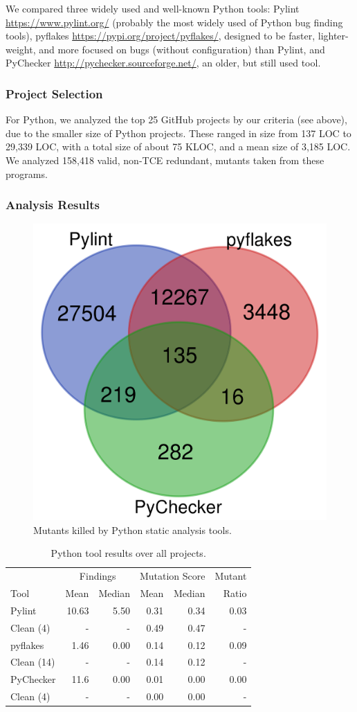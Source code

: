 We compared three widely used and well-known Python tools:  Pylint \url{https://www.pylint.org/} (probably the most widely used of Python bug finding tools), pyflakes \url{https://pypi.org/project/pyflakes/}, designed to be faster, lighter-weight, and more focused on bugs (without configuration) than Pylint, and PyChecker \url{http://pychecker.sourceforge.net/}, an older, but still used tool.

\subsubsection{Project Selection}

For Python, we analyzed the top 25 GitHub projects by our criteria (see above), due to the smaller size of Python projects.  These ranged in size from 137 LOC to 29,339 LOC, with a total size of about 75 KLOC, and a mean size of 3,185 LOC.  We analyzed 158,418 valid, non-TCE redundant, mutants taken from these programs.

\subsubsection{Analysis Results}


\begin{figure}
  \centering
  \includegraphics[width=0.30\columnwidth]{python_new.png}
  \caption{Mutants killed by Python static analysis tools.}
  \label{fig:pythonvenn}
\end{figure}

\begin{table}
\begin{tabular}{l|r|r|r|r|r}
& \multicolumn{2}{|c|}{Findings} & \multicolumn{2}{|c|}{Mutation Score} & Mutant \\
Tool & Mean & Median & Mean & Median & Ratio\\
\hline
\hline
Pylint & 10.63 & 5.50 & 0.31 & 0.34 & 0.03 \\
Clean (4) & - & - & 0.49 & 0.47 & - \\
\hline
pyflakes & 1.46 & 0.00 & 0.14 & 0.12 & 0.09 \\
Clean (14) & - & - & 0.14 & 0.12 & - \\
\hline
PyChecker & 11.6 & 0.00 & 0.01 & 0.00 & 0.00 \\
Clean (4) & - & - & 0.00 & 0.00 & - \\
\hline
\end{tabular}
\caption{Python tool results over all projects.}
\label{tab:scorepython}
\end{table}

